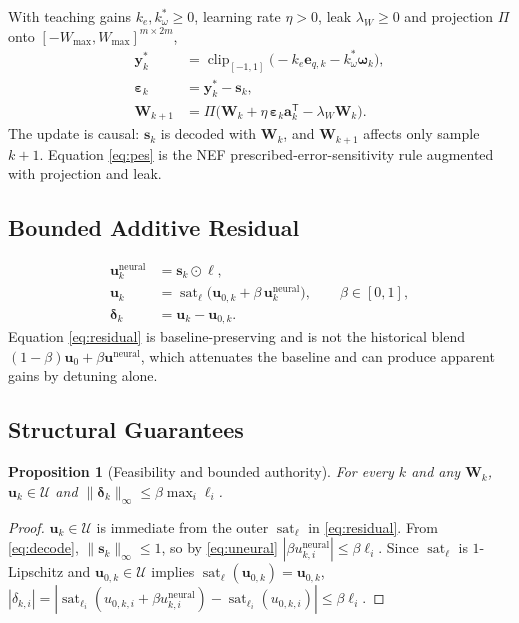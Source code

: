 \documentclass[letterpaper,10pt,conference]{IEEEtran}
\newcommand{\T}{^{\mathsf T}}
\newcommand{\sat}{\operatorname{sat}}
\newcommand{\clip}{\operatorname{clip}}
\newtheorem{proposition}{Proposition}
\begin{document}
With teaching gains $k_e,k_\omega^{*}\ge0$, learning rate $\eta>0$, leak
$\lambda_W\ge0$ and projection $\Pi$ onto
$[-W_{\max},W_{\max}]^{m\times2m}$,
\begin{align}
    \bm y_k^{*} &= \clip_{[-1,1]}\!\big(
        -k_e\bm e_{q,k}-k_\omega^{*}\bm\omega_k\big),
    \label{eq:target}\\
    \bm\varepsilon_k &= \bm y_k^{*}-\bm s_k,
    \label{eq:pes_err}\\
    \bm W_{k+1} &= \Pi\!\big(\bm W_k
        +\eta\,\bm\varepsilon_k\bm a_k\T-\lambda_W\bm W_k\big).
    \label{eq:pes}
\end{align}
The update is causal: $\bm s_k$ is decoded with $\bm W_k$, and
$\bm W_{k+1}$ affects only sample $k{+}1$. Equation \eqref{eq:pes} is the
NEF prescribed-error-sensitivity rule \cite{bekolay2014nengo,voelker2015pes}
augmented with projection and leak.

\subsection{Bounded Additive Residual}

\begin{align}
    \bm u_k^{\mathrm{neural}} &= \bm s_k\odot\bm\ell,
    \label{eq:uneural}\\
    \bm u_k &= \sat_{\bm\ell}\!\big(
        \bm u_{0,k}+\beta\,\bm u_k^{\mathrm{neural}}\big),
    \qquad \beta\in[0,1],
    \label{eq:residual}\\
    \bm\delta_k &= \bm u_k-\bm u_{0,k}.
    \label{eq:delta}
\end{align}
Equation \eqref{eq:residual} is baseline-preserving and is not the
historical blend $(1-\beta)\bm u_0+\beta\bm u^{\mathrm{neural}}$, which
attenuates the baseline and can produce apparent gains by detuning alone.

\subsection{Structural Guarantees}

\begin{proposition}[Feasibility and bounded authority]
\label{prop:bounded}
For every $k$ and any $\bm W_k$, $\bm u_k\in\mathcal U$ and
$\|\bm\delta_k\|_\infty\le\beta\max_i\ell_i$.
\end{proposition}
\begin{proof}
$\bm u_k\in\mathcal U$ is immediate from the outer $\sat_{\bm\ell}$ in
\eqref{eq:residual}. From \eqref{eq:decode}, $\|\bm s_k\|_\infty\le1$, so
by \eqref{eq:uneural} $|\beta u^{\mathrm{neural}}_{k,i}|\le\beta\ell_i$.
Since $\sat_{\bm\ell}$ is $1$-Lipschitz and $\bm u_{0,k}\in\mathcal U$
implies $\sat_{\bm\ell}(\bm u_{0,k})=\bm u_{0,k}$,
$|\delta_{k,i}|=|\sat_{\ell_i}(u_{0,k,i}+\beta u^{\mathrm{neural}}_{k,i})
-\sat_{\ell_i}(u_{0,k,i})|\le\beta\ell_i$.
\end{proof}
\end{document}
